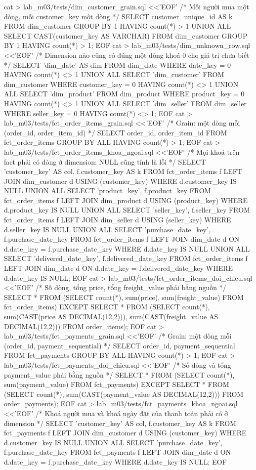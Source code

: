 \begin{codeblock}
cat > lab_m03/tests/dim_customer_grain.sql <<'EOF'
/* Mỗi người mua một dòng, mỗi customer_key một dòng */
SELECT customer_unique_id AS k FROM dim_customer GROUP BY 1 HAVING count(*) > 1
UNION ALL
SELECT CAST(customer_key AS VARCHAR) FROM dim_customer
GROUP BY 1 HAVING count(*) > 1;
EOF
cat > lab_m03/tests/dim_unknown_row.sql <<'EOF'
/* Dimension nào cũng có đúng một dòng khoá 0 cho giá trị chưa biết */
SELECT 'dim_date' AS dim FROM dim_date WHERE date_key = 0 HAVING count(*) <> 1
UNION ALL SELECT 'dim_customer' FROM dim_customer
          WHERE customer_key = 0 HAVING count(*) <> 1
UNION ALL SELECT 'dim_product' FROM dim_product
          WHERE product_key = 0 HAVING count(*) <> 1
UNION ALL SELECT 'dim_seller' FROM dim_seller
          WHERE seller_key = 0 HAVING count(*) <> 1;
EOF
cat > lab_m03/tests/fct_order_items_grain.sql <<'EOF'
/* Grain: một dòng mỗi (order_id, order_item_id) */
SELECT order_id, order_item_id FROM fct_order_items
GROUP BY ALL HAVING count(*) > 1;
EOF
cat > lab_m03/tests/fct_order_items_khoa_ngoai.sql <<'EOF'
/* Mọi khoá trên fact phải có dòng ở dimension; NULL cũng tính là lỗi */
SELECT 'customer_key' AS col, f.customer_key AS k FROM fct_order_items f
  LEFT JOIN dim_customer d USING (customer_key) WHERE d.customer_key IS NULL
UNION ALL SELECT 'product_key', f.product_key FROM fct_order_items f
  LEFT JOIN dim_product d USING (product_key) WHERE d.product_key IS NULL
UNION ALL SELECT 'seller_key', f.seller_key FROM fct_order_items f
  LEFT JOIN dim_seller d USING (seller_key) WHERE d.seller_key IS NULL
UNION ALL SELECT 'purchase_date_key', f.purchase_date_key FROM fct_order_items f
  LEFT JOIN dim_date d ON d.date_key = f.purchase_date_key WHERE d.date_key IS NULL
UNION ALL SELECT 'delivered_date_key', f.delivered_date_key FROM fct_order_items f
  LEFT JOIN dim_date d ON d.date_key = f.delivered_date_key
  WHERE d.date_key IS NULL;
EOF
cat > lab_m03/tests/fct_order_items_doi_chieu.sql <<'EOF'
/* Số dòng, tổng price, tổng freight_value phải bằng nguồn */
SELECT * FROM
  (SELECT count(*), sum(price), sum(freight_value) FROM fct_order_items)
EXCEPT
SELECT * FROM
  (SELECT count(*), sum(CAST(price AS DECIMAL(12,2))),
          sum(CAST(freight_value AS DECIMAL(12,2))) FROM order_items);
EOF
cat > lab_m03/tests/fct_payments_grain.sql <<'EOF'
/* Grain: một dòng mỗi (order_id, payment_sequential) */
SELECT order_id, payment_sequential FROM fct_payments
GROUP BY ALL HAVING count(*) > 1;
EOF
cat > lab_m03/tests/fct_payments_doi_chieu.sql <<'EOF'
/* Số dòng và tổng payment_value phải bằng nguồn */
SELECT * FROM (SELECT count(*), sum(payment_value) FROM fct_payments)
EXCEPT
SELECT * FROM (SELECT count(*), sum(CAST(payment_value AS DECIMAL(12,2)))
               FROM order_payments);
EOF
cat > lab_m03/tests/fct_payments_khoa_ngoai.sql <<'EOF'
/* Khoá người mua và khoá ngày đặt của thanh toán phải có ở dimension */
SELECT 'customer_key' AS col, f.customer_key AS k FROM fct_payments f
  LEFT JOIN dim_customer d USING (customer_key) WHERE d.customer_key IS NULL
UNION ALL SELECT 'purchase_date_key', f.purchase_date_key FROM fct_payments f
  LEFT JOIN dim_date d ON d.date_key = f.purchase_date_key WHERE d.date_key IS NULL;
EOF


\end{codeblock}
